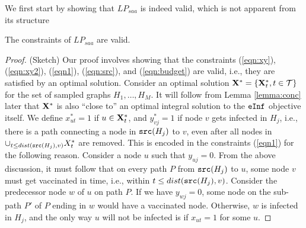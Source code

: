 We first start by showing that $LP_{saa}$ is indeed valid, which is not apparent from its structure

\begin{lemma}
The constraints of $LP_{saa}$ are valid.
\end{lemma}
\begin{proof} (Sketch)
Our proof involves showing that the constraints (\ref{eqn:xy}), (\ref{eqn:xy2}), (\ref{eqn1}),
(\ref{eqn:src}), and (\ref{eqn:budget}) are valid, i.e., they are satisfied by an optimal solution.
Consider an optimal solution $\mathbf{X}^*=\{\mathbf{X}^*_t, t\in\mathcal{T}\}$ for the set of sampled graphs
$H_1,\ldots,H_M$. It will follow from Lemma \ref{lemma:conc} later that $\mathbf{X}^*$ is also ``close to''
an optimal integral solution to the $\texttt{eInf}$ objective itself.
We define $x^*_{ut}=1$ if $u\in\mathbf{X}^*_t$, and $y^*_{vj}=1$ if node $v$ gets infected in $H_j$, i.e.,
there is a path connecting a node in $\texttt{src}(H_j)$ to $v$, even after all nodes in $\cup_{t\leq dist(\texttt{src}(H_j), v)} X^*_t$ are 
removed.
This is encoded in the constraints (\ref{eqn1}) for the following reason. 
Consider a node $u$ such that $y_{uj}=0$. From the above discussion, it must follow that on every path $P$ from
$\texttt{src}(H_j)$ to $u$, some node $v$ must get vaccinated in time, i.e., within $t\leq dist(\texttt{src}(H_j), v)$.
Consider the predecessor node $w$ of $u$ on path $P$. If we have $y_{wj}=0$, some node on the sub-path $P'$ of $P$
ending in $w$ would have a vaccinated node. Otherwise, $w$ is infected in $H_j$, and the only way $u$ will not be
infected is if $x_{ut}=1$ for some $u$.
\end{proof}

